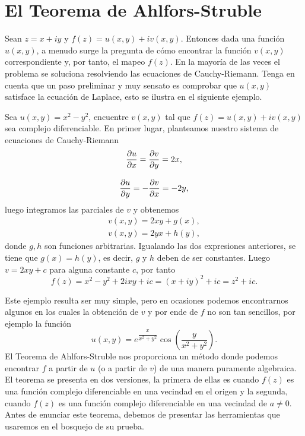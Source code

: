 \section{El Teorema de Ahlfors-Struble}
 Sean $z = x + iy$ y $f(z) = u(x, y)+iv(x, y)$. Entonces dada una función $u(x, y)$, a menudo surge la pregunta de cómo encontrar la función $v(x,y)$ correspondiente y, por tanto, el mapeo  $f(z)$. En la mayoría de las veces el problema se soluciona resolviendo las ecuaciones de Cauchy-Riemann. Tenga en cuenta que un paso preliminar y muy sensato es comprobar que $u(x,y)$  satisface la ecuación de Laplace, esto se ilustra en el siguiente ejemplo.
 \begin{Ejem}\label{EjCR}
 	Sea $u(x,y)=x^2-y^2$, encuentre $v(x,y)$ tal que $f(z)=u(x,y)+iv(x,y)$ sea complejo diferenciable.
 	\solu
 	\noindent En primer lugar, planteamos nuestro sistema de ecuaciones de Cauchy-Riemann
 	\[
 		\begin{array}{c}
 			\dfrac{\partial u}{\partial x}=\dfrac{\partial v}{\partial y}=2x,\\\\
 			\dfrac{\partial u}{\partial y}=-\dfrac{\partial v}{\partial x}=-2y,
 		\end{array}
 	\]
 	luego integramos las parciales de $v$ y obtenemos
 	\[
 		\begin{array}{c}
 			v(x,y)=2xy+g(x),\\
 			v(x,y)=2yx+h(y),
 		\end{array}
 	\]
 	donde $g,h$ son funciones arbitrarias. Igualando las dos expresiones anteriores, se tiene que $g(x)=h(y)$, es decir, $g$ y $h$ deben de ser constantes. Luego $v=2xy+c$ para alguna constante $c$, por tanto 
 	$$f(z)=x^2-y^2+2ixy+ic=(x+iy)^2+ic=z^2+ic.$$\endproof
 \end{Ejem}
Este ejemplo resulta ser muy simple, pero en ocasiones podemos encontrarnos algunos en los cuales la obtención  de $v$ y
por ende de $f$ no son tan sencillos, por ejemplo  la función 
$$u(x,y)=e^{\dfrac{x}{x^2+y^2}}\cos\left(\dfrac{y}{x^2+y^{2}}\right).$$
El Teorema de Ahlfors-Struble nos proporciona un método donde podemos encontrar $f$ a partir de $u$ (o a partir de $v$) de una manera puramente algebraica. El teorema se presenta en dos versiones, la primera de ellas es cuando $f(z)$ es una función complejo diferenciable en una vecindad en el origen y la segunda,  cuando $f(z)$ es una función complejo diferenciable en una vecindad de $a\neq 0$.\\
\noindent Antes de enunciar este teorema, debemos de presentar las herramientas que usaremos en el bosquejo de su prueba.\\
